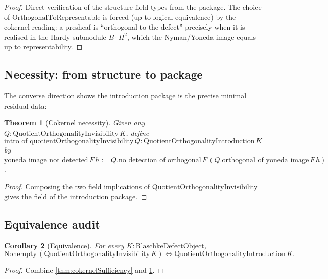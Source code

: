 \documentclass[12pt]{article}
\newtheorem{theorem}{Theorem}[section]
\newtheorem{corollary}[theorem]{Corollary}
\theoremstyle{definition}
\theoremstyle{remark}
\newcommand{\HardyTwo}{H^{2}}
\newcommand{\BS}{B}
\begin{document}
\begin{proof}
Direct verification of the structure-field types from the package. The choice of $\mathrm{OrthogonalToRepresentable}$ is forced (up to logical equivalence) by the cokernel reading: a presheaf is ``orthogonal to the defect'' precisely when it is realised in the Hardy submodule $\BS \cdot \HardyTwo$, which the Nyman/Yoneda image equals up to representability. \qedhere
\end{proof}

\subsection{Necessity: from structure to package}\label{subsec:necessity}

The converse direction shows the introduction package is the precise minimal residual data:

\begin{theorem}[Cokernel necessity]\label{thm:cokernelNecessity}
Given any $Q : \mathrm{QuotientOrthogonalityInvisibility}\,K$, define
\begin{equation}\label{eq:cokernelNec}
  \mathrm{intro\_of\_quotientOrthogonalityInvisibility}\,Q
  : \mathrm{QuotientOrthogonalityIntroduction}\,K
\end{equation}
by $\mathrm{yoneda\_image\_not\_detected}\,F\,h := Q.\mathrm{no\_detection\_of\_orthogonal}\,F\,(Q.\mathrm{orthogonal\_of\_yoneda\_image}\,F\,h)$.
\end{theorem}

\begin{proof}
Composing the two field implications of $\mathrm{QuotientOrthogonalityInvisibility}$ gives the field of the introduction package.
\end{proof}

\subsection{Equivalence audit}

\begin{corollary}[Equivalence]\label{cor:cokernelEquiv}
For every $K : \mathrm{BlaschkeDefectObject}$,
\begin{equation}\label{eq:cokernelEquiv}
  \mathrm{Nonempty}\,(\mathrm{QuotientOrthogonalityInvisibility}\,K)
  \iff
  \mathrm{QuotientOrthogonalityIntroduction}\,K.
\end{equation}
\end{corollary}

\begin{proof}
Combine \cref{thm:cokernelSufficiency} and \cref{thm:cokernelNecessity}.
\end{proof}
\end{document}
